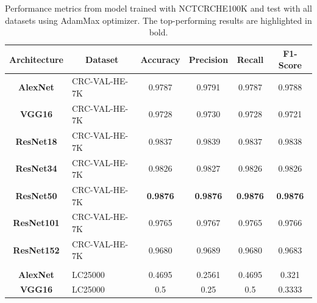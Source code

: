 \begin{table}[t!]
\centering

\caption{Performance metrics from model trained with \gls{NCTCRCHE100K} and test with all datasets using AdamMax optimizer. The top-performing results are highlighted in bold.}
\label{table_NCTCRCHE100K_adammax}

\begin{tabular}{|c|l|c|c|c|c|}
\hline
\textbf{Architecture}  & \multicolumn{1}{c|}{\textbf{Dataset}} & \textbf{Accuracy}          & \textbf{Precision}    & \textbf{Recall}       & \textbf{F1-Score}     \\ \hline
\textbf{AlexNet}       & CRC-VAL-HE-7K                         & 0.9787                & 0.9791                & 0.9787                & 0.9788                \\ \hline
\textbf{VGG16}         & CRC-VAL-HE-7K                         & 0.9728                & 0.9730                & 0.9728                & 0.9721                \\ \hline
\textbf{ResNet18}      & CRC-VAL-HE-7K                         & 0.9837                & 0.9839                & 0.9837                & 0.9838                \\ \hline
\textbf{ResNet34}      & CRC-VAL-HE-7K                         & 0.9826                & 0.9827                & 0.9826                & 0.9826                \\ \hline
\textbf{ResNet50}      & CRC-VAL-HE-7K                         & \textbf{0.9876}                & \textbf{0.9876}                & \textbf{0.9876}                & \textbf{0.9876}                \\ \hline
\textbf{ResNet101}     & CRC-VAL-HE-7K                         & 0.9765                & 0.9767                & 0.9765                & 0.9766                \\ \hline
\textbf{ResNet152}     & CRC-VAL-HE-7K                         & 0.9680                & 0.9689                & 0.9680                & 0.9683                \\ \hline
\multicolumn{1}{|l|}{} &                                       & \multicolumn{1}{l|}{} & \multicolumn{1}{l|}{} & \multicolumn{1}{l|}{} & \multicolumn{1}{l|}{} \\ \hline
\textbf{AlexNet}       & LC25000                               & 0.4695                & 0.2561                & 0.4695                & 0.321                 \\ \hline
\textbf{VGG16}         & LC25000                               & 0.5                   & 0.25                  & 0.5                   & 0.3333                \\ \hline

\end{tabular}
\end{table}
